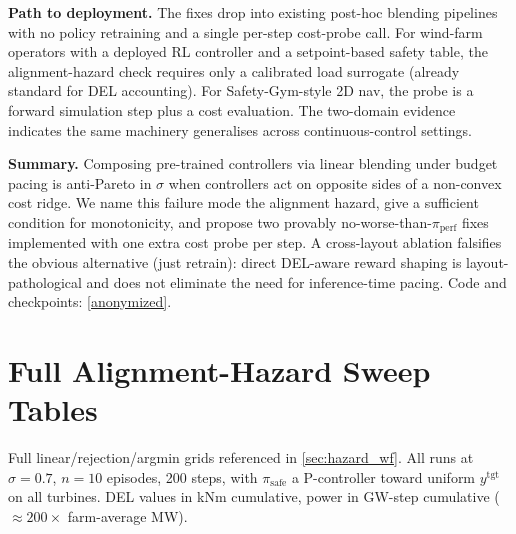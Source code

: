 \documentclass{article}
\begin{document}
\textbf{Path to deployment.}
The fixes drop into existing post-hoc blending pipelines with no policy retraining and a single per-step cost-probe call.
For wind-farm operators with a deployed RL controller and a setpoint-based safety table, the alignment-hazard check requires only a calibrated load surrogate (already standard for DEL accounting).
For Safety-Gym-style 2D nav, the probe is a forward simulation step plus a cost evaluation.
The two-domain evidence indicates the same machinery generalises across continuous-control settings.

\textbf{Summary.}
Composing pre-trained controllers via linear blending under budget pacing is anti-Pareto in $\sigma$ when controllers act on opposite sides of a non-convex cost ridge.
We name this failure mode the alignment hazard, give a sufficient condition for monotonicity, and propose two provably no-worse-than-$\pi_{\mathrm{perf}}$ fixes implemented with one extra cost probe per step.
A cross-layout ablation falsifies the obvious alternative (just retrain): direct DEL-aware reward shaping is layout-pathological and does not eliminate the need for inference-time pacing.
Code and checkpoints: \url{[anonymized]}.

\appendix
\section{Full Alignment-Hazard Sweep Tables}
\label{app:full_sweep}

Full linear/rejection/argmin grids referenced in \cref{sec:hazard_wf}.
All runs at $\sigma=0.7$, $n=10$ episodes, 200 steps, with $\pi_{\mathrm{safe}}$ a P-controller toward uniform $y^{\mathrm{tgt}}$ on all turbines.
DEL values in kNm cumulative, power in GW-step cumulative ($\approx 200\times$ farm-average MW).
\end{document}
